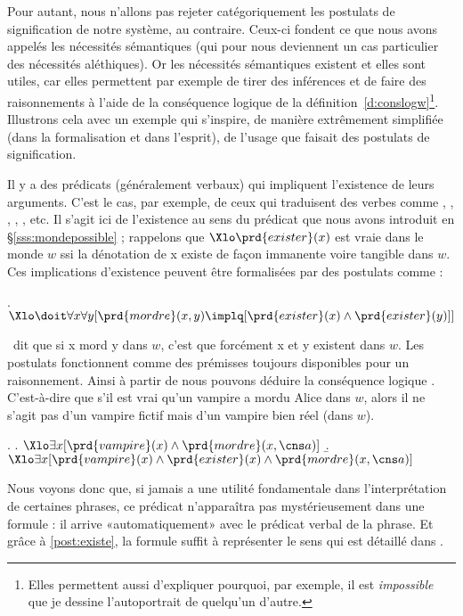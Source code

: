 Pour autant, nous n'allons pas rejeter catégoriquement les postulats de signification de notre système, au contraire. Ceux-ci fondent ce que nous avons appelés les nécessités sémantiques (qui pour nous deviennent  un cas particulier des nécessités aléthiques). Or les nécessités sémantiques existent et elles sont utiles, car elles permettent par exemple de tirer des inférences et de faire des raisonnements à l'aide de la conséquence logique de la définition~\ref{d:conslogw}\footnote{Elles permettent aussi d'expliquer pourquoi, par exemple, il est \emph{impossible} que je dessine l'autoportrait de quelqu'un d'autre.}. 
Illustrons cela avec un exemple qui s'inspire, de manière extrêmement simplifiée (dans la formalisation et dans l'esprit), de l'usage que faisait \citet{PTQ} des postulats de signification.

Il y a des prédicats (généralement verbaux) qui impliquent l'existence de leurs arguments. C'est le cas, par exemple, de ceux qui traduisent des verbes comme , , , ,  , etc.
Il s'agit ici de l'existence au sens du prédicat  que nous avons introduit en \S\ref{sss:mondepossible} ; rappelons que \(\Xlo\prd{exister}(x)\) est vraie dans le monde $w$ ssi la dénotation de \vrb x existe de façon immanente voire tangible dans $w$.
Ces implications d'existence peuvent être formalisées par des postulats comme :

\ex. \label{post:existe}
\(\Xlo\doit\forall x\forall y [\prd{mordre}(x,y) \implq [\prd{exister}(x) \wedge \prd{exister}(y)]]\)

\Last\ dit que si \vrb x mord \vrb y dans $w$, c'est que forcément \vrb x et \vrb y existent dans $w$.  Les postulats fonctionnent comme des prémisses toujours disponibles pour un raisonnement. Ainsi à partir de \Next[a] nous pouvons déduire la conséquence logique \Next[b].  C'est-à-dire que s'il est vrai qu'un vampire a mordu Alice dans $w$, alors il ne s'agit pas d'un vampire fictif mais d'un vampire bien réel (dans $w$).

\ex. 
\a. \(\Xlo\exists x [\prd{vampire}(x)\wedge\prd{mordre}(x,\cns a)]\)
\b. \(\Xlo\exists x [\prd{vampire}(x)\wedge\prd{exister}(x)\wedge\prd{mordre}(x,\cns a)]\)


Nous voyons donc que, si jamais  a une utilité fondamentale dans l'interprétation de certaines phrases, ce prédicat n'apparaîtra pas mystérieusement dans une formule : il arrive «automatiquement» avec le prédicat verbal de la phrase.  Et grâce à  \ref{post:existe}, la formule \Last[a] suffit à représenter le sens qui est détaillé dans \Last[b].


